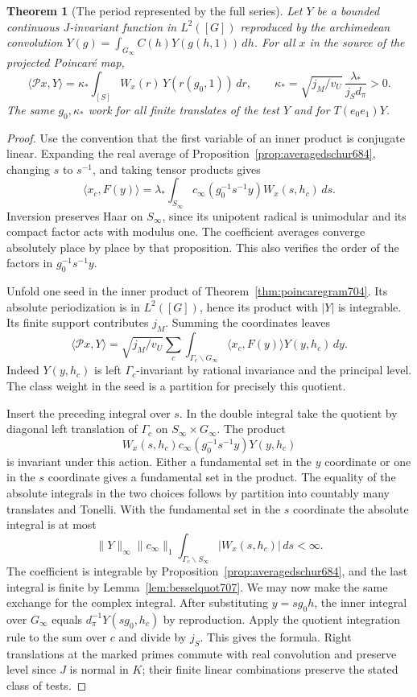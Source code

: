 \documentclass[a4paper,11pt]{article}
\newtheorem{theorem}[proposition]{Theorem}
\theoremstyle{definition}
\theoremstyle{remark}
\numberwithin{equation}{section}
\begin{document}
\begin{theorem}[The period represented by the full series]\leavevmode
\label{thm:besselperiod707}
Let \(Y\) be a bounded continuous \(J\)-invariant function in
\(L^2([G])\) reproduced by the archimedean convolution
\(Y(g)=\int_{G_\infty}C(h)Y(g(h,1))\,dh\). For all \(x\)
in the source of the projected Poincar\'e map,
\[
 \langle\mathcal P x,Y\rangle
   =\kappa_*\int_{[S]} W_x(r)\,Y(r(g_0,1))\,dr,\qquad
 \kappa_*=\sqrt{j_M/v_U}\,\frac{\lambda_*}{j_Sd_\pi}>0 .
\]
The same \(g_0,\kappa_*\) work for all finite translates of
the test \(Y\) and for \(T(e_0e_1)Y\).
\end{theorem}
\begin{proof}
Use the convention that the first variable of an inner
product is conjugate linear. Expanding the real average of
Proposition~\ref{prop:averagedschur684}, changing \(s\) to
\(s^{-1}\), and taking tensor products gives
\[
  \langle x_c,F(y)\rangle
    =\lambda_*\int_{S_\infty}
           c_\infty(g_0^{-1}s^{-1}y)W_x(s,h_c)\,ds .
\]
Inversion preserves Haar on \(S_\infty\), since its unipotent
radical is unimodular and its compact factor acts with
modulus one. The coefficient averages converge absolutely
place by place by that proposition. This also verifies the
order of the factors in \(g_0^{-1}s^{-1}y\).

Unfold one seed in the inner product of
Theorem~\ref{thm:poincaregram704}. Its absolute periodization
is in \(L^2([G])\), hence its product with \(|Y|\) is
integrable. Its finite support contributes \(j_M\). Summing
the coordinates leaves
\[
 \langle\mathcal P x,Y\rangle
   =\sqrt{j_M/v_U}\sum_c\int_{\Gamma_c\backslash G_\infty}
              \langle x_c,F(y)\rangle Y(y,h_c)\,dy .
\]
Indeed \(Y(y,h_c)\) is left \(\Gamma_c\)-invariant by
rational invariance and the principal level. The class
weight in the seed is a partition for precisely this
quotient.

Insert the preceding integral over \(s\). In the double
integral take the quotient by diagonal left translation
of \(\Gamma_c\) on \(S_\infty\times G_\infty\). The product
\[
  W_x(s,h_c)c_\infty(g_0^{-1}s^{-1}y)Y(y,h_c)
\]
is invariant under this action. Either a fundamental set
in the \(y\) coordinate or one in the \(s\) coordinate gives
a fundamental set in the product. The equality of the
absolute integrals in the two choices follows by partition
into countably many translates and Tonelli. With the
fundamental set in the \(s\) coordinate the absolute integral
is at most
\[
   \|Y\|_\infty\|c_\infty\|_1
                 \int_{\Gamma_c\backslash S_\infty}|W_x(s,h_c)|\,ds
        <\infty .
\]
The coefficient is integrable by
Proposition~\ref{prop:averagedschur684}, and the last
integral is finite by Lemma~\ref{lem:besselquot707}. We
may now make the same exchange for the complex integral.
After substituting \(y=sg_0h\), the inner integral over
\(G_\infty\) equals \(d_\pi^{-1}Y(sg_0,h_c)\) by
reproduction. Apply the quotient integration rule to the
sum over \(c\) and divide by \(j_S\). This gives the formula.
Right translations at the marked primes commute with real
convolution and preserve level since \(J\) is normal in
\(K\); their finite linear combinations preserve the
stated class of tests.
\end{proof}
\end{document}
